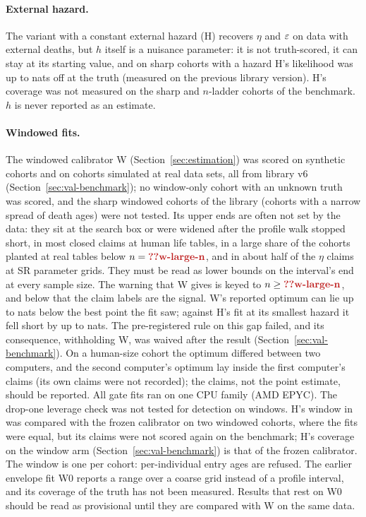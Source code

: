\paragraph{External hazard.} The variant with a constant external hazard (H) recovers $\eta$ and $\varepsilon$ on data with
external deaths, but $h$ itself is a nuisance parameter: it is not truth-scored, it can stay at its starting value,
and on sharp cohorts with a hazard H's likelihood was up to  nats off at the truth
(measured on the previous library version). H's coverage was not measured on the sharp and $n$-ladder cohorts of
the benchmark. $h$ is never reported as an estimate.

\paragraph{Windowed fits.} The windowed calibrator W (Section~\ref{sec:estimation}) was scored on synthetic cohorts and on
cohorts simulated at real data sets, all from library v6 (Section~\ref{sec:val-benchmark}); no window-only cohort with an
unknown truth was scored, and the  sharp windowed cohorts of the library (cohorts with a narrow spread of
death ages) were not tested. Its upper ends are often not set by the data: they sit at the search box or were widened after the
profile walk stopped short, in most closed claims at human life tables, in a large share of the cohorts planted at real tables
below $n=\C{w-large-n}$, and in about half of the $\eta$ claims at SR parameter grids. They must be read as lower bounds on the
interval's end at every sample size. The warning that W gives is keyed to $n\ge\C{w-large-n}$, and below that the claim labels
are the signal. W's reported optimum can lie up to  nats below the best point the fit saw; against H's fit at its
smallest hazard it fell short by up to  nats. The pre-registered rule on this gap failed, and its consequence,
withholding W, was waived after the result (Section~\ref{sec:val-benchmark}). On a human-size cohort the optimum differed
between two computers, and the second computer's optimum lay inside the first computer's claims (its own claims were not
recorded); the claims, not the point estimate, should be reported. All gate fits ran on one CPU family (AMD EPYC). The drop-one
leverage check was not tested for detection on windows. H's window in  was compared with the frozen calibrator
on two windowed cohorts, where the fits were equal, but its claims were not scored again on the benchmark; H's coverage on the
window arm (Section~\ref{sec:val-benchmark}) is that of the frozen calibrator. The window is one per cohort: per-individual entry ages are refused. The earlier envelope fit W0 reports a
range over a coarse grid instead of a profile interval, and its coverage of the truth has not been measured. Results that rest
on W0 should be read as provisional until they are compared with W on the same data.

